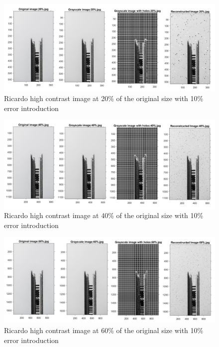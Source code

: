 
\begin{figure}[!ht]
\center \includegraphics[scale=0.32]{Ricardo20.jpg}
\caption{Ricardo high contrast image at 20\% of the original size with 10\% error introduction}
\label{fig:Ricardo20}
\end{figure}

\begin{figure}[!ht]
\center \includegraphics[scale=0.32]{Ricardo40.jpg}
\caption{Ricardo high contrast image at 40\% of the original size with 10\% error introduction}
\label{fig:Ricardo40}
\end{figure}

\begin{figure}[!ht]
\center \includegraphics[scale=0.32]{Ricardo60.jpg}
\caption{Ricardo high contrast image at 60\% of the original size with 10\% error introduction}
\label{fig:Ricardo60}
\end{figure}

